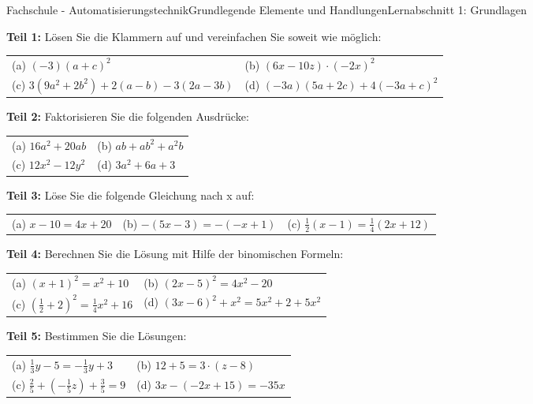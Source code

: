 \documentclass[oneside,openany,headings=optiontotoc,11pt,numbers=noenddot]{scrreprt}
\begin{document}
	\begin{worksheet}{Fachschule - Automatisierungstechnik}{Grundlegende Elemente und Handlungen}{Lernabschnitt 1: Grundlagen}
		\noindent	
		\begin{framed}
			\noindent
			\textbf{Teil 1:} Lösen Sie die Klammern auf und vereinfachen Sie soweit wie möglich:\\
			\begin{tabularx}{\textwidth}{XX}
				(a) \((-3)(a+c)^2\) & (b) \((6x-10z)\cdot{}(-2x)^2\)\\
				(c) \(3(9a^2+2b^2)+2(a-b)-3(2a-3b)\) & (d) \((-3a)(5a+2c) + 4(-3a+c)^2\)
			\end{tabularx}
		\end{framed}
		\begin{framed}
			\noindent
			\textbf{Teil 2:} Faktorisieren Sie die folgenden Ausdrücke:\\
			\begin{tabularx}{\textwidth}{XX}
				(a) \(16a^2 +20ab\) & (b) \(ab +ab^2+a^2b\)\\
				(c) \(12x^2-12y^2\) & (d) \(3a^2+6a+3\)
			\end{tabularx}
		\end{framed}
		\begin{framed}
			\noindent
			\textbf{Teil 3:} Löse Sie die folgende Gleichung nach x auf:\\
			\begin{tabularx}{\textwidth}{XXX}
				(a) \(x-10 = 4x+20\) & (b) \(-(5x-3) =-(-x+1)\) & (c) \(\frac{1}{2}(x-1) = \frac{1}{4}(2x+12)\)
			\end{tabularx}
		\end{framed}
		\begin{framed}
			\noindent
			\textbf{Teil 4:} Berechnen Sie die Lösung mit Hilfe der binomischen Formeln:\\
			\begin{tabularx}{\textwidth}{XX}
				(a) \((x+1)^2 = x^2 + 10\) & (b) \((2x-5)^2 = 4x^2 -20\)\\
				(c) \((\frac{1}{2} + 2)^2 = \frac{1}{4}x^2 +16\) & (d) \((3x-6)^2 + x^2 = 5x^2 +2 +5x^2\)
			\end{tabularx}
		\end{framed}
		\begin{framed}
			\noindent
			\textbf{Teil 5:} Bestimmen Sie die Lösungen:\\
			\begin{tabularx}{\textwidth}{XX}
				(a) \(\frac{1}{3}y -5 = -\frac{1}{3}y + 3\) & (b) \(12 +5 = 3\cdot{}(z-8)\)\\
				(c) \(\frac{2}{5}+(-\frac{1}{5}z) + \frac{3}{5} = 9\) & (d) \(3x -(-2x+15) = -35x\)
			\end{tabularx}
		\end{framed}
	\end{worksheet}
\end{document}
